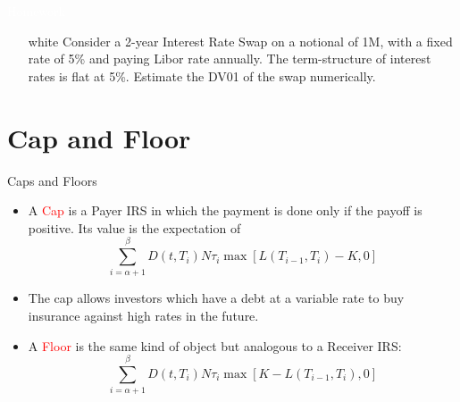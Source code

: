 \documentclass{beamer}
\begin{document}

\begin{homework}
\begin{frame}{\textcolor{white}{Homework}}
\begin{itemize}
\item[white] Consider a 2-year Interest Rate Swap on a notional of 1M, with a fixed rate of 5\% and paying Libor rate annually. The term-structure of interest rates is flat at 5\%.
Estimate the DV01 of the swap numerically.  
\end{itemize}
\end{frame}
\end{homework}

\section{Cap and Floor}
\begin{frame}{Caps and Floors}
	\begin{itemize}
		\item<1-> A \textcolor{red}{Cap} is a Payer IRS in which the payment is done only if the payoff is positive. Its value is the expectation of 
		\begin{equation}
			\sum_{i=\alpha+1}^{\beta}D(t,T_i)N\tau_i\max\left[L(T_{i-1},T_i)-K,0\right]
			\label{eq:cap}
		\end{equation} 
		\item<2-> The cap allows investors which have a debt at a variable rate to buy insurance against high rates in the future.
		\item<3-> A \textcolor{red}{Floor} is the same kind of object but analogous to a Receiver IRS:
		\begin{equation}
			\sum_{i=\alpha+1}^{\beta}D(t,T_i)N\tau_i\max\left[K-L(T_{i-1},T_i),0\right]
			\label{eq:floor}
		\end{equation} 
	\end{itemize}
\end{frame}
\end{document}

